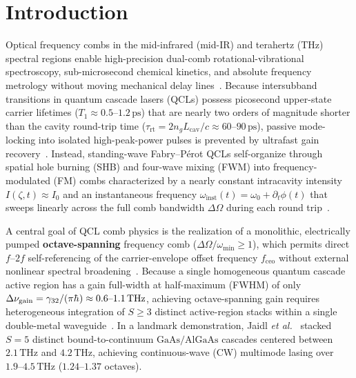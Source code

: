 \documentclass[11pt,letterpaper]{article}
\renewcommand{\hbar}{\mathchar'26\mkern-9mu h}
\begin{document}
\begin{abstract}
$2.48\,\mathrm{THz}$ ($1.92\text{--}4.40\,\mathrm{THz}$, $1.20$ octaves, $142$ cavity modes) with first-order coherence $g^{(1)} = 0.9994$ and a $1.8\,\mathrm{kHz}$ intermode beatnote linewidth.
\end{abstract}

\section{Introduction}
\label{sec:intro}

Optical frequency combs in the mid-infrared (mid-IR) and terahertz (THz) spectral regions enable high-precision dual-comb rotational-vibrational spectroscopy, sub-microsecond chemical kinetics, and absolute frequency metrology without moving mechanical delay lines~\cite{Hugi2012,Burghoff2014,Rosch2015,Faist2016,Piccardo2020,SilvestriRoadmap2025}. Because intersubband transitions in quantum cascade lasers (QCLs) possess picosecond upper-state carrier lifetimes ($T_1 \approx 0.5\text{--}1.2\,\mathrm{ps}$) that are nearly two orders of magnitude shorter than the cavity round-trip time ($\tau_{\mathrm{rt}} = 2 n_g L_{\mathrm{cav}}/c \approx 60\text{--}90\,\mathrm{ps}$), passive mode-locking into isolated high-peak-power pulses is prevented by ultrafast gain recovery~\cite{Khurgin2014,Villares2015,Vurgaftman2021}. Instead, standing-wave Fabry--P\'erot QCLs self-organize through spatial hole burning (SHB) and four-wave mixing (FWM) into frequency-modulated (FM) combs characterized by a nearly constant intracavity intensity $I(\zeta, t) \approx I_0$ and an instantaneous frequency $\omega_{\mathrm{inst}}(t) = \omega_0 + \partial_t \phi(t)$ that sweeps linearly across the full comb bandwidth $\Delta\Omega$ during each round trip~\cite{Singleton2018,Burghoff2020,Opa2021,RoyBurghoffRoadmap2025}.

A central goal of QCL comb physics is the realization of a monolithic, electrically pumped \textbf{octave-spanning} frequency comb ($\Delta\Omega/\omega_{\min} \ge 1$), which permits direct $f$--$2f$ self-referencing of the carrier-envelope offset frequency $f_{\mathrm{ceo}}$ without external nonlinear spectral broadening~\cite{Rosch2015,Jaidl2021,JaidlUnterrainerRoadmap2025}. Because a single homogeneous quantum cascade active region has a gain full-width at half-maximum (FWHM) of only $\Delta\nu_{\mathrm{gain}} = \gamma_{32}/(\pi\hbar) \approx 0.6\text{--}1.1\,\mathrm{THz}$, achieving octave-spanning gain requires heterogeneous integration of $S \ge 3$ distinct active-region stacks within a single double-metal waveguide~\cite{Turcinkova2011,Rosch2015,Garrasi2019,Jaidl2021}. In a landmark demonstration, Jaidl \textit{et al.}~\cite{Jaidl2021,JaidlUnterrainerRoadmap2025} stacked $S = 5$ distinct bound-to-continuum $\mathrm{GaAs}/\mathrm{AlGaAs}$ cascades centered between $2.1\,\mathrm{THz}$ and $4.2\,\mathrm{THz}$, achieving continuous-wave (CW) multimode lasing over $1.9\text{--}4.5\,\mathrm{THz}$ ($1.24\text{--}1.37$ octaves).
\end{document}

